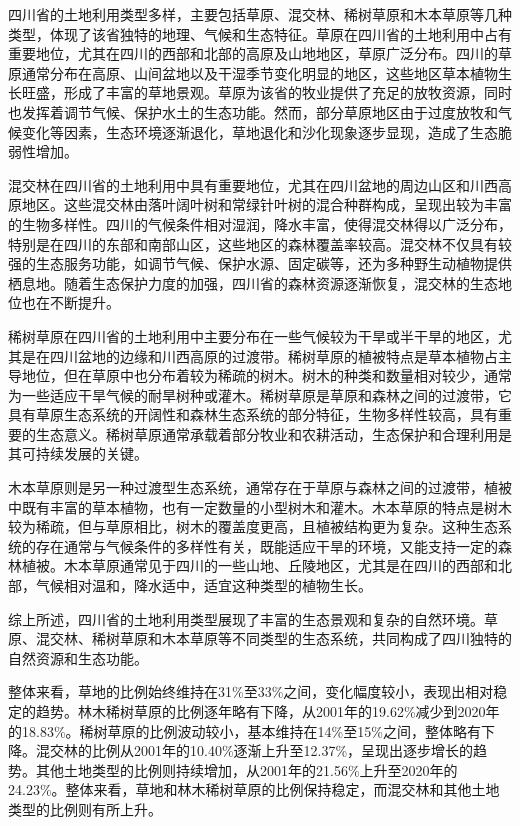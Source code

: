 \documentclass[AutoFakeBold]{LZUThesis-PgD&PhD}
\begin{document}
		
		四川省的土地利用类型多样，主要包括草原、混交林、稀树草原和木本草原等几种类型，体现了该省独特的地理、气候和生态特征。草原在四川省的土地利用中占有重要地位，尤其在四川的西部和北部的高原及山地地区，草原广泛分布。四川的草原通常分布在高原、山间盆地以及干湿季节变化明显的地区，这些地区草本植物生长旺盛，形成了丰富的草地景观。草原为该省的牧业提供了充足的放牧资源，同时也发挥着调节气候、保护水土的生态功能。然而，部分草原地区由于过度放牧和气候变化等因素，生态环境逐渐退化，草地退化和沙化现象逐步显现，造成了生态脆弱性增加。
		
		混交林在四川省的土地利用中具有重要地位，尤其在四川盆地的周边山区和川西高原地区。这些混交林由落叶阔叶树和常绿针叶树的混合种群构成，呈现出较为丰富的生物多样性。四川的气候条件相对湿润，降水丰富，使得混交林得以广泛分布，特别是在四川的东部和南部山区，这些地区的森林覆盖率较高。混交林不仅具有较强的生态服务功能，如调节气候、保护水源、固定碳等，还为多种野生动植物提供栖息地。随着生态保护力度的加强，四川省的森林资源逐渐恢复，混交林的生态地位也在不断提升。
		
		稀树草原在四川省的土地利用中主要分布在一些气候较为干旱或半干旱的地区，尤其是在四川盆地的边缘和川西高原的过渡带。稀树草原的植被特点是草本植物占主导地位，但在草原中也分布着较为稀疏的树木。树木的种类和数量相对较少，通常为一些适应干旱气候的耐旱树种或灌木。稀树草原是草原和森林之间的过渡带，它具有草原生态系统的开阔性和森林生态系统的部分特征，生物多样性较高，具有重要的生态意义。稀树草原通常承载着部分牧业和农耕活动，生态保护和合理利用是其可持续发展的关键。
		
		木本草原则是另一种过渡型生态系统，通常存在于草原与森林之间的过渡带，植被中既有丰富的草本植物，也有一定数量的小型树木和灌木。木本草原的特点是树木较为稀疏，但与草原相比，树木的覆盖度更高，且植被结构更为复杂。这种生态系统的存在通常与气候条件的多样性有关，既能适应干旱的环境，又能支持一定的森林植被。木本草原通常见于四川的一些山地、丘陵地区，尤其是在四川的西部和北部，气候相对温和，降水适中，适宜这种类型的植物生长。
		
		综上所述，四川省的土地利用类型展现了丰富的生态景观和复杂的自然环境。草原、混交林、稀树草原和木本草原等不同类型的生态系统，共同构成了四川独特的自然资源和生态功能。
		
		
		整体来看，草地的比例始终维持在31\%至33\%之间，变化幅度较小，表现出相对稳定的趋势。林木稀树草原的比例逐年略有下降，从2001年的19.62\%减少到2020年的18.83\%。稀树草原的比例波动较小，基本维持在14\%至15\%之间，整体略有下降。混交林的比例从2001年的10.40\%逐渐上升至12.37\%，呈现出逐步增长的趋势。其他土地类型的比例则持续增加，从2001年的21.56\%上升至2020年的24.23\%。整体来看，草地和林木稀树草原的比例保持稳定，而混交林和其他土地类型的比例则有所上升。
		
\end{document}

